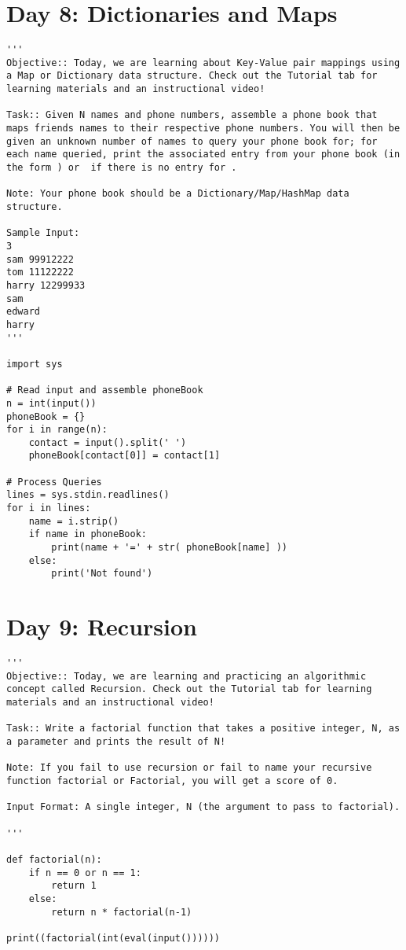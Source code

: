 \documentclass[11pt,a4paper]{article}
\begin{document}
\newpage
\section{Day 8: Dictionaries and Maps}
\begin{lstlisting}
'''
Objective:: Today, we are learning about Key-Value pair mappings using a Map or Dictionary data structure. Check out the Tutorial tab for learning materials and an instructional video!

Task:: Given N names and phone numbers, assemble a phone book that maps friends names to their respective phone numbers. You will then be given an unknown number of names to query your phone book for; for each name queried, print the associated entry from your phone book (in the form ) or  if there is no entry for .

Note: Your phone book should be a Dictionary/Map/HashMap data structure.

Sample Input:
3
sam 99912222
tom 11122222
harry 12299933
sam
edward
harry
'''

import sys 

# Read input and assemble phoneBook
n = int(input())
phoneBook = {}
for i in range(n):
    contact = input().split(' ')
    phoneBook[contact[0]] = contact[1]

# Process Queries
lines = sys.stdin.readlines()
for i in lines:
    name = i.strip()
    if name in phoneBook:
        print(name + '=' + str( phoneBook[name] ))
    else:
        print('Not found')
\end{lstlisting}



\newpage
\section{Day 9: Recursion}
\begin{lstlisting}
'''
Objective:: Today, we are learning and practicing an algorithmic concept called Recursion. Check out the Tutorial tab for learning materials and an instructional video!

Task:: Write a factorial function that takes a positive integer, N, as a parameter and prints the result of N! 

Note: If you fail to use recursion or fail to name your recursive function factorial or Factorial, you will get a score of 0.

Input Format: A single integer, N (the argument to pass to factorial).

'''

def factorial(n):
    if n == 0 or n == 1:
        return 1
    else:
        return n * factorial(n-1)

print((factorial(int(eval(input())))))

\end{lstlisting}
\end{document}
